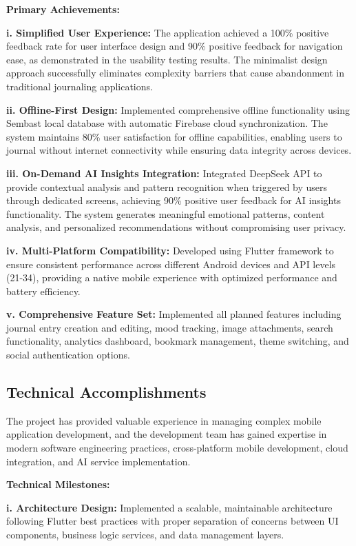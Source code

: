 \textbf{Primary Achievements:}

\textbf{i. Simplified User Experience:} The application achieved a 100\% positive feedback rate for user interface design and 90\% positive feedback for navigation ease, as demonstrated in the usability testing results. The minimalist design approach successfully eliminates complexity barriers that cause abandonment in traditional journaling applications.

\textbf{ii. Offline-First Design:} Implemented comprehensive offline functionality using Sembast local database with automatic Firebase cloud synchronization. The system maintains 80\% user satisfaction for offline capabilities, enabling users to journal without internet connectivity while ensuring data integrity across devices.

\textbf{iii. On-Demand AI Insights Integration:} Integrated DeepSeek API to provide contextual analysis and pattern recognition when triggered by users through dedicated screens, achieving 90\% positive user feedback for AI insights functionality. The system generates meaningful emotional patterns, content analysis, and personalized recommendations without compromising user privacy.

\textbf{iv. Multi-Platform Compatibility:} Developed using Flutter framework to ensure consistent performance across different Android devices and API levels (21-34), providing a native mobile experience with optimized performance and battery efficiency.

\textbf{v. Comprehensive Feature Set:} Implemented all planned features including journal entry creation and editing, mood tracking, image attachments, search functionality, analytics dashboard, bookmark management, theme switching, and social authentication options.

\subsection{Technical Accomplishments}

The project has provided valuable experience in managing complex mobile application development, and the development team has gained expertise in modern software engineering practices, cross-platform mobile development, cloud integration, and AI service implementation.

\textbf{Technical Milestones:}

\textbf{i. Architecture Design:} Implemented a scalable, maintainable architecture following Flutter best practices with proper separation of concerns between UI components, business logic services, and data management layers.

